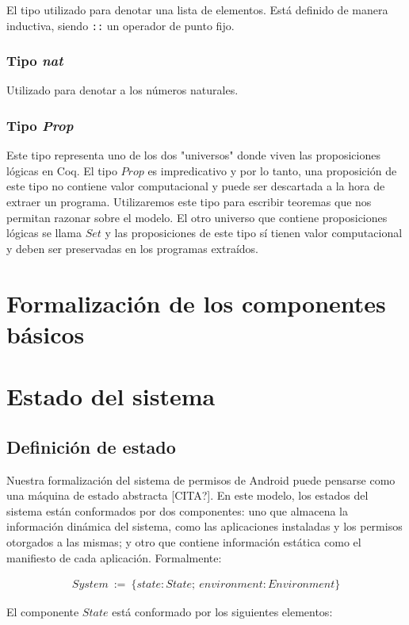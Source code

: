 El tipo utilizado para denotar una lista de elementos. Está definido de manera inductiva, siendo
\texttt{::} un operador de punto fijo. 

\subsubsection*{Tipo \textit{nat}}
Utilizado para denotar a los números naturales.

\subsubsection*{Tipo \textit{Prop}}

Este tipo representa uno de los dos "universos" donde viven las proposiciones lógicas en Coq. El tipo
$Prop$ es impredicativo y por lo tanto, una proposición de este tipo no contiene valor
computacional\cite{proof-irrelevance} y puede ser descartada a la hora de extraer un programa.
Utilizaremos este tipo para escribir teoremas que nos permitan razonar sobre el modelo. El otro
universo que contiene proposiciones lógicas se llama $Set$ y las proposiciones de este tipo sí tienen
valor computacional y deben ser preservadas en los programas extraídos.


\section{Formalización de los componentes básicos}


\section{Estado del sistema}
\subsection{Definición de estado}
Nuestra formalización del sistema de permisos de Android puede pensarse como una máquina de estado
abstracta [CITA?]. En este modelo, los estados del sistema están conformados por dos componentes: uno
que almacena la información dinámica del sistema, como las aplicaciones instaladas y los permisos otorgados
a las mismas; y otro que contiene información estática como el manifiesto de cada aplicación. Formalmente:

\begin{align*}
System\ :=\ \{ state: State;\ environment: Environment \}
\end{align*}


El componente $State$ está conformado por los siguientes elementos:

